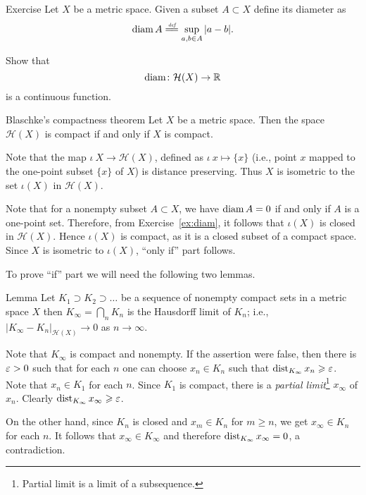 \begin{thm}{Exercise}\label{ex:diam}
Let $X$ be a metric space.
Given a subset $A\subset X$ define its diameter as 
$$\diam A\df\sup_{a,b\in A} |a-b|.$$

Show that 
$$\operatorname{diam}\colon\mathcal{H}(X)\to \mathbb{R}$$ 
is a continuous function.
\end{thm}


\begin{thm}{Blaschke's compactness theorem}\label{thm:compact+Hausdorff}
Let $X$ be a metric space.
Then the space $\mathcal{H}(X)$ is compact if and only if $X$ is compact.
\end{thm}




Note that the map $\iota\:X\to \mathcal{H}(X)$, defined as $\iota\:x\mapsto\{x\}$
(i.e., point $x$ mapped to the one-point subset $\{x\}$ of $X$)
is distance preserving.
Thus $X$ is isometric to the set $\iota(X)$ in $\mathcal{H}(X)$.

Note that for a nonempty subset $A\subset X$, we have $\operatorname{diam} A=0$ if and only if $A$ is a one-point set.
Therefore, from Exercise~\ref{ex:diam}, it follows 
that $\iota(X)$ is closed in $\mathcal{H}(X)$.
Hence $\iota(X)$ is compact, as it is a closed subset of a compact space. 
Since $X$ is isometric to $\iota(X)$,
``only if'' part follows.
\qeds

To prove ``if'' part we will need the following two lemmas.%

\begin{thm}{Lemma}\label{lem:decreasing-converges}
Let $K_1\supset K_2\supset\dots$ be a sequence of nonempty compact sets in a metric space $X$
then $K_\infty=\bigcap_n K_n$ is the Hausdorff limit of $K_n$;
i.e., $|K_\infty-K_n|_{\mathcal{H}(X)}\to0$ as $n\to\infty$.
\end{thm}

Note that $K_\infty$ is compact and nonempty.
If the assertion were false, 
then there is $\varepsilon>0$ such that for each $n$ 
one can choose $x_n\in K_n$
such that $\operatorname{dist}_{K_\infty}x_n\geqslant\varepsilon$.
Note that $x_n\in K_1$ for each $n$.
Since $K_1$ is compact, 
there is 
a \emph{partial limit}\footnote{Partial limit is a limit of a subsequence.}
 $x_\infty$ of $x_n$.
Clearly $\operatorname{dist}_{K_\infty}x_\infty\geqslant \varepsilon$.

On the other hand, since $K_n$ is closed and $x_m\in K_n$ for $m\ge n$,
we get $x_\infty\in K_n$ for each $n$.
It follows that $x_\infty\in K_\infty$ and therefore $\operatorname{dist}_{K_\infty}x_\infty=0$,
a contradiction.\qeds

